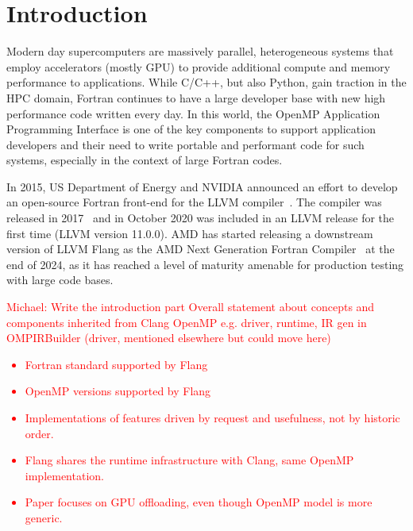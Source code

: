 \documentclass[acmtog,natbib=false]{acmart}
\newcommand{\todo}[1]{\textcolor{red}{#1}}
\begin{document}

\section{Introduction}
\label{sec:Introduction}

Modern day supercomputers are massively parallel, heterogeneous systems that employ accelerators (mostly GPU) to provide additional compute and memory performance to applications.
While C/C++, but also Python, gain traction in the \ac{HPC} domain, Fortran continues to have a large developer base with new high performance code written every day.
In this world, the OpenMP Application Programming Interface is one of the key components to support application developers and their need to write portable and performant code for such systems, especially in the context of large Fortran codes.

In 2015, US Department of Energy and NVIDIA announced an effort to develop an open-source Fortran front-end for the LLVM compiler~\cite{Flang-Nvidia-NNSA}.
The compiler was released in 2017~\cite{Pric17} and in October 2020 was included in an LLVM release for the first time (LLVM version 11.0.0).
AMD has started releasing a downstream version of LLVM Flang as the AMD Next Generation Fortran Compiler~\cite{AMD24} at the end of 2024, as it has reached a level of maturity amenable for production testing with large code bases.

\todo{Michael: Write the introduction part}
\todo{Overall statement about concepts and components inherited from Clang OpenMP e.g. driver, runtime, IR gen in OMPIRBuilder (driver, mentioned elsewhere but could move here)}
\todo{
\begin{itemize}
\item Fortran standard supported by Flang
\item OpenMP versions supported by Flang
\item Implementations of features driven by request and usefulness, not by historic order.
\item Flang shares the runtime infrastructure with Clang, same OpenMP implementation. 
\item Paper focuses on GPU offloading, even though OpenMP model is more generic.
\end{itemize}
}
\end{document}
